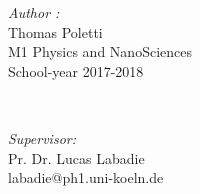 \documentclass[a4paper,twoside,11pt]{article}
\begin{document}
\begin{titlepage}
	
	\begin{minipage}{0.4\textwidth}
		\begin{flushleft} \large
			\emph{Author :} \\
			Thomas Poletti\\
          M1 Physics and NanoSciences\\
          School-year 2017-2018\\
			\end{flushleft}
			\end{minipage}~
			\begin{minipage}{0.4\textwidth}
            
			\begin{flushright} \large
   			\emph{Supervisor:}\\
			Pr. Dr. Lucas Labadie\\
            labadie@ph1.uni-koeln.de\\
		\end{flushright}
        
	\end{minipage}\\[2 cm]
	
    
    
	
\end{titlepage}
\end{document}
